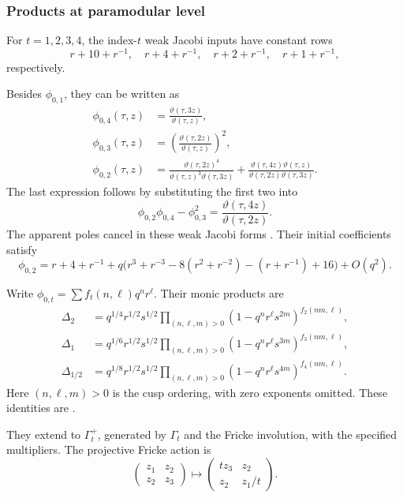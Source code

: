 \subsubsection{Products at paramodular level}
For \(t=1,2,3,4\), the index-\(t\) weak Jacobi inputs have
constant rows
\[
 r+10+r^{-1},\quad r+4+r^{-1},\quad
 r+2+r^{-1},\quad r+1+r^{-1},
\]
respectively.

Besides \(\phi_{0,1}\), they can be written as
\[
\begin{aligned}
 \phi_{0,4}(\tau,z)&=\frac{\vartheta(\tau,3z)}{\vartheta(\tau,z)},\\
 \phi_{0,3}(\tau,z)&=
       \left(\frac{\vartheta(\tau,2z)}{\vartheta(\tau,z)}\right)^2,\\
 \phi_{0,2}(\tau,z)&=
 \frac{\vartheta(\tau,2z)^4}
      {\vartheta(\tau,z)^3\vartheta(\tau,3z)}
 +\frac{\vartheta(\tau,4z)\vartheta(\tau,z)}
      {\vartheta(\tau,2z)\vartheta(\tau,3z)}.
\end{aligned}
\]
The last expression follows by substituting the first two into
\[
 \phi_{0,2}\phi_{0,4}-\phi_{0,3}^2
 =\frac{\vartheta(\tau,4z)}{\vartheta(\tau,2z)}.
\]
The apparent poles cancel in these weak Jacobi forms
\cite[Lemma 2.5 and (2.10), (2.24)]{GNII}.
Their initial coefficients satisfy
\[
 \phi_{0,2}=r+4+r^{-1}
 +q\bigl(r^3+r^{-3}-8(r^2+r^{-2})-(r+r^{-1})+16\bigr)+O(q^2).
\]

Write
\(\phi_{0,t}=\sum f_t(n,\ell)q^nr^\ell\).
Their monic products are
\[
\begin{aligned}
 \Delta_2&=q^{1/4}r^{1/2}s^{1/2}
       \prod_{(n,\ell,m)>0}(1-q^nr^\ell s^{2m})^{f_2(nm,\ell)},\\
 \Delta_1&=q^{1/6}r^{1/2}s^{1/2}
       \prod_{(n,\ell,m)>0}(1-q^nr^\ell s^{3m})^{f_3(nm,\ell)},\\
 \Delta_{1/2}&=q^{1/8}r^{1/2}s^{1/2}
       \prod_{(n,\ell,m)>0}(1-q^nr^\ell s^{4m})^{f_4(nm,\ell)}.
\end{aligned}
\]
Here \((n,\ell,m)>0\) is the cusp ordering, with zero exponents
omitted.  These identities are
\cite[(2.11), (2.20)--(2.21)]{GNII}.

They extend to \(\Gamma_t^+\), generated by \(\Gamma_t\)
and the Fricke involution, with the specified multipliers.
The projective Fricke action is
\[
 \begin{pmatrix}z_1&z_2\\z_2&z_3\end{pmatrix}
 \longmapsto
 \begin{pmatrix}tz_3&z_2\\z_2&z_1/t\end{pmatrix}.
\]

